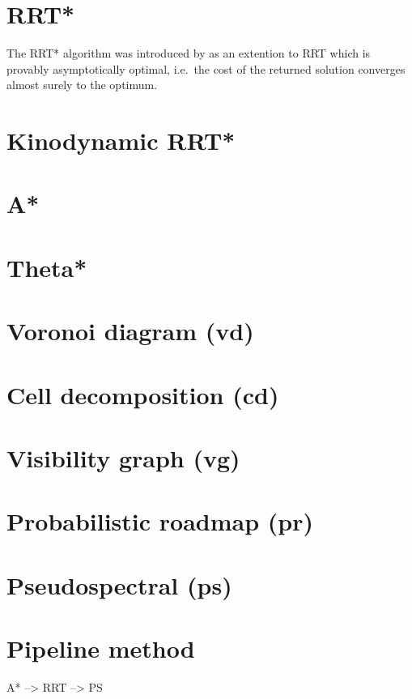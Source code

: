 \section{RRT*}

The RRT* algorithm was introduced by \parencite{sertac2011} as an extention to RRT which is provably asymptotically optimal, i.e.\ the cost of the returned solution converges almost surely to the optimum. 


\section{Kinodynamic RRT*}

\section{A*}
\section{Theta*}
\section{Voronoi diagram (\gls{vd})}
\section{Cell decomposition (\gls{cd})}
\section{Visibility graph (\gls{vg})}
\section{Probabilistic roadmap (\gls{pr})}
\section{Pseudospectral (\gls{ps})}
\section{Pipeline method}
A* --> RRT --> PS

